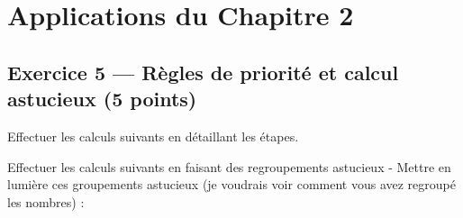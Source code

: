 \documentclass{exam}
\begin{document}
\section*{Applications du Chapitre 2}

\subsection*{Exercice 5 — Règles de priorité et calcul astucieux (5 points)}

\begin{questions}
  \question[2.5] Effectuer les calculs suivants en détaillant les étapes.
\end{questions}

\begin{questions}
  \question[2.5] Effectuer les calculs suivants en faisant des regroupements astucieux - Mettre en lumière ces groupements astucieux (je voudrais voir comment vous avez regroupé les nombres) :
\end{questions}
\end{document}
